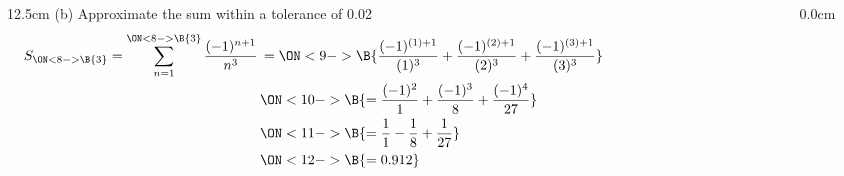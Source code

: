 \begin{frame}
\begin{columns}
\begin{column}{12.5cm}
(b) Approximate the sum within a tolerance of 0.02
\begin{align*}
	S_{\ON<8->{\B{3}}} = \sum \limits_{n=1}^{\ON<8->{\B{3}}} \frac{(-1)^{n+1}}{n^3} &\,= \ON<9->{\B{\frac{(-1)^{(1)+1}}{(1)^3} + \frac{(-1)^{(2)+1}}{(2)^3} + \frac{(-1)^{(3)+1}}{(3)^3}}} \hspace{4.0cm}\\
	&\,\ON<10->{\B{= \frac{(-1)^{2}}{1} + \frac{(-1)^{3}}{8} + \frac{(-1)^{4}}{27}}} \\
	&\,\ON<11->{\B{= \frac{1}{1} - \frac{1}{8} + \frac{1}{27}}} \\
	&\,\ON<12->{\B{= 0.912}}
\end{align*}

\vspace{0.5cm}

\end{column}
\begin{column}{0.0cm}
	
\end{column}
\end{columns}
\end{frame}

